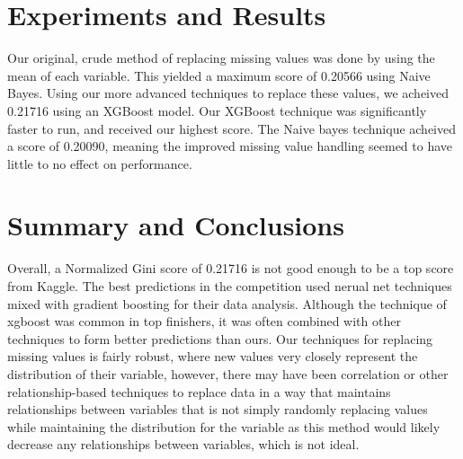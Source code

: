 \documentclass[fleqn,10pt]{SelfArx} %
\begin{document}
\bigskip
\bigskip
\section{Experiments and Results}
Our original, crude method of replacing missing values was done by using the mean of each variable. This yielded a maximum score of 0.20566 using Naive Bayes. Using our more advanced techniques to replace these values, we acheived 0.21716 using an XGBoost model. Our XGBoost technique was significantly faster to run, and received our highest score. The Naive bayes technique acheived a score of 0.20090, meaning the improved missing value handling seemed to have little to no effect on performance.



\bigskip
\bigskip
\section{Summary and Conclusions}
Overall, a Normalized Gini score of 0.21716 is not good enough to be a top score from Kaggle. The best predictions in the competition used nerual net techniques mixed with gradient boosting for their data analysis. Although the technique of xgboost was common in top finishers, it was often combined with other techniques to form better predictions than ours. Our techniques for replacing missing values is fairly robust, where new values very closely represent the distribution of their variable, however, there may have been correlation or other relationship-based techniques to replace data in a way that maintains relationships between variables that is not simply randomly replacing values while maintaining the distribution for the variable as this method would likely decrease any relationships between variables, which is not ideal.
\bigskip
\bigskip
\bigskip
\end{document}
